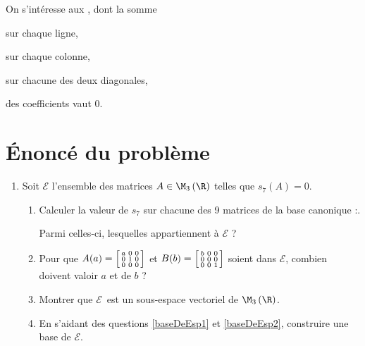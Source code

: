 \documentclass[12pt]{article}
\newcommand\Esp{\mathcal{E}}
\begin{document}
On s'intéresse aux , dont la somme 
\begin{enligneItemize}
  \item sur chaque ligne,
  \item sur chaque colonne,
  \item sur chacune des deux diagonales,
\end{enligneItemize}
\hfiller des coefficients vaut  0.

\section{Énoncé du problème}
\begin{enumerate}
  \item Soit \(\Esp\) l'ensemble des matrices \(A\in\M_{3}\left( \R\right) \) telles que \(s_{7}(A) =0\).
  \begin{enumerate}
    \item \label{baseDeEsp1}
      Calculer la valeur de $s_7$ sur chacune des 9 matrices de la base canonique :\quad {}.

      Parmi celles-ci, lesquelles appartiennent à $\Esp$ ? \quad {}
    \item \label{baseDeEsp2}Pour que
      $A(a) = 
      \begin{bsmallmatrix}
        a & 0 & 0 \\ 
        0 & 1 & 0 \\ 
        0 & 0 & 0 \\ 
      \end{bsmallmatrix}
      $
      et
      $B(b) = 
      \begin{bsmallmatrix}
        b & 0 & 0 \\ 
        0 & 0 & 0 \\ 
        0 & 0 & 1 \\ 
      \end{bsmallmatrix}
      $
      soient dans $\Esp$, combien doivent valoir $a$ et de $b$ ?
    \item Montrer que \(\Esp\)~est un sous-espace vectoriel de \(\M_{3}\left( \R\right) \).
    \item En s'aidant des questions \ref{baseDeEsp1} et \ref{baseDeEsp2}, construire une base de $\Esp$.
      \par {}
  \end{enumerate}
\end{enumerate}
\end{document}
